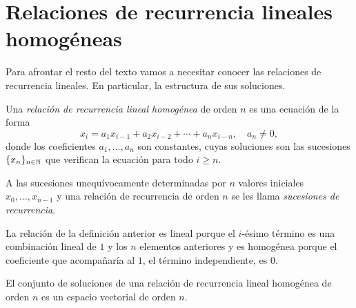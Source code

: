\section{Relaciones de recurrencia lineales homogéneas}

Para afrontar el resto del texto vamos a necesitar
conocer las relaciones de recurrencia lineales.
En particular, la estructura de sus soluciones.

\begin{definition}
    Una \emph{relación de recurrencia lineal homogénea} de orden $n$
    es una ecuación de la forma
    \begin{equation*}
        x_i = a_1x_{i-1} + a_2x_{i-2} + \cdots + a_nx_{i-n},
        \quad a_n \ne 0,
    \end{equation*}
    donde los coeficientes $a_1,\ldots,a_n$ son constantes,
    cuyas soluciones son las sucesiones $\{x_n\}_{n \in \mathbb{N}}$
    que verifican la ecuación para todo $i \ge n$.

    A las sucesiones unequívocamente determinadas por
    $n$ valores iniciales $x_0,\ldots,x_{n-1}$
    y una relación de recurrencia de orden $n$
    se les llama \emph{sucesiones de recurrencia}.
\end{definition}

\begin{remark}
    La relación de la definición anterior es lineal porque el $i$-ésimo término
    es una combinación lineal de $1$ y los $n$ elementos anteriores
    y es homogénea porque el coeficiente que acompañaría al $1$,
    el término independiente,
    es $0$.
\end{remark}

\begin{theorem}
    El conjunto de soluciones de una
    relación de recurrencia lineal homogénea de orden $n$
    es un espacio vectorial de orden $n$.
\end{theorem}

